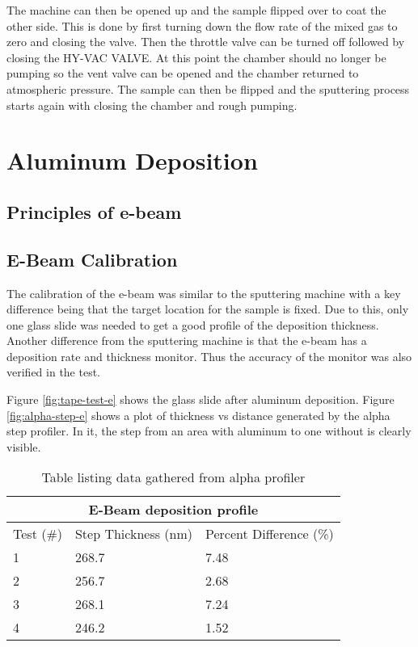 The machine can then be opened up and the sample flipped over to coat the other side.
This is done by first turning down the flow rate of the mixed gas to zero and closing the valve.
Then the throttle valve can be turned off followed by closing the HY-VAC VALVE.
At this point the chamber should no longer be pumping so the vent valve can be opened and the chamber returned to atmospheric pressure.
The sample can then be flipped and the sputtering process starts again with closing the chamber and rough pumping.


\section{Aluminum Deposition}
\subsection{Principles of e-beam}

\subsection{E-Beam Calibration}
The calibration of the e-beam was similar to the sputtering machine with a key difference being that the target location for the sample is fixed.
Due to this, only one glass slide was needed to get a good profile of the deposition thickness.
Another difference from the sputtering machine is that the e-beam has a deposition rate and thickness monitor.
Thus the accuracy of the monitor was also verified in the test.

Figure \ref{fig:tape-test-e} shows the glass slide after aluminum deposition.
Figure \ref{fig:alpha-step-e} shows a plot of thickness vs distance generated by the alpha step profiler.
In it, the step from an area with aluminum to one without is clearly visible.

\begin{table}[htpb]
\centering
\begin{tabular}{ |p{4cm}|p{4cm}|p{4cm}|  }
 \hline
 \multicolumn{3}{|c|}{E-Beam deposition profile} \\
 \hline
 Test (\#)&Step Thickness (nm)&Percent Difference (\%)\\
 \hline
 1   & 268.7    &7.48\\
 2&   256.7  & 2.68\\
 3 &268.1 & 7.24\\
 4    &246.2 & 1.52\\
 \hline
\end{tabular}
\caption{Table listing data gathered from alpha profiler}
\label{table:test-e}
\end{table}

